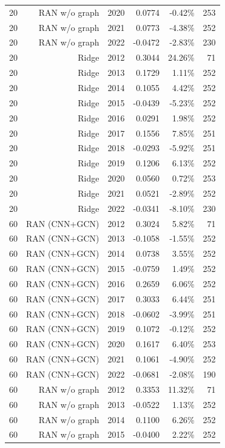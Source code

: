 \documentclass[10pt]{article}
\begin{document}
\begin{longtable}{lrrrrr}
20 & RAN w/o graph & 2020 & 0.0774 & -0.42\% & 253 \\
20 & RAN w/o graph & 2021 & 0.0773 & -4.38\% & 252 \\
20 & RAN w/o graph & 2022 & -0.0472 & -2.83\% & 230 \\
20 & Ridge & 2012 & 0.3044 & 24.26\% & 71 \\
20 & Ridge & 2013 & 0.1729 & 1.11\% & 252 \\
20 & Ridge & 2014 & 0.1055 & 4.42\% & 252 \\
20 & Ridge & 2015 & -0.0439 & -5.23\% & 252 \\
20 & Ridge & 2016 & 0.0291 & 1.98\% & 252 \\
20 & Ridge & 2017 & 0.1556 & 7.85\% & 251 \\
20 & Ridge & 2018 & -0.0293 & -5.92\% & 251 \\
20 & Ridge & 2019 & 0.1206 & 6.13\% & 252 \\
20 & Ridge & 2020 & 0.0560 & 0.72\% & 253 \\
20 & Ridge & 2021 & 0.0521 & -2.89\% & 252 \\
20 & Ridge & 2022 & -0.0341 & -8.10\% & 230 \\
60 & RAN (CNN+GCN) & 2012 & 0.3024 & 5.82\% & 71 \\
60 & RAN (CNN+GCN) & 2013 & -0.1058 & -1.55\% & 252 \\
60 & RAN (CNN+GCN) & 2014 & 0.0738 & 3.55\% & 252 \\
60 & RAN (CNN+GCN) & 2015 & -0.0759 & 1.49\% & 252 \\
60 & RAN (CNN+GCN) & 2016 & 0.2659 & 6.06\% & 252 \\
60 & RAN (CNN+GCN) & 2017 & 0.3033 & 6.44\% & 251 \\
60 & RAN (CNN+GCN) & 2018 & -0.0602 & -3.99\% & 251 \\
60 & RAN (CNN+GCN) & 2019 & 0.1072 & -0.12\% & 252 \\
60 & RAN (CNN+GCN) & 2020 & 0.1617 & 6.40\% & 253 \\
60 & RAN (CNN+GCN) & 2021 & 0.1061 & -4.90\% & 252 \\
60 & RAN (CNN+GCN) & 2022 & -0.0681 & -2.08\% & 190 \\
60 & RAN w/o graph & 2012 & 0.3353 & 11.32\% & 71 \\
60 & RAN w/o graph & 2013 & -0.0522 & 1.13\% & 252 \\
60 & RAN w/o graph & 2014 & 0.1100 & 6.26\% & 252 \\
60 & RAN w/o graph & 2015 & -0.0400 & 2.22\% & 252 \\

\end{longtable}
\end{document}
